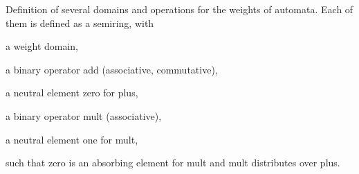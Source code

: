 Definition of several domains and operations for the weights of automata. Each of them is defined as a semiring, with


\begin{DoxyItemize}
\item a weight domain,
\item a binary operator {\ttfamily add} (associative, commutative),
\item a neutral element {\ttfamily zero} for {\ttfamily plus},
\item a binary operator {\ttfamily mult} (associative),
\item a neutral element {\ttfamily one} for mult,
\end{DoxyItemize}

such that {\ttfamily zero} is an absorbing element for {\ttfamily mult} and {\ttfamily mult} distributes over {\ttfamily plus}.


